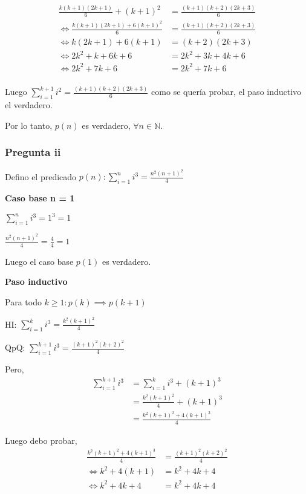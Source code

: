 \begin{align*}
    \frac{k(k+1)(2k+1)}{6} + (k+1)^2 &= \frac{(k+1)(k+2)(2k+3)}{6} \\
    \iff \frac{k(k+1)(2k+1) + 6(k+1)^2}{6} &= \frac{(k+1)(k+2)(2k+3)}{6} \\
    \iff k(2k+1) + 6(k+1) &= (k+2)(2k+3) \\
    \iff 2k^2+k + 6k+6 &= 2k^2+3k+4k+6 \\
    \iff 2k^2+7k+6 &= 2k^2+7k+6 \\
\end{align*}

Luego $\sum_{i=1}^{k+1}i^2 =  \frac{(k+1)(k+2)(2k+3)}{6}$ como se quería probar, el paso inductivo el verdadero.

Por lo tanto, $p(n)$ es verdadero, $\forall n \in \mathbb{N}$.

\subsubsection{Pregunta ii}

Defino el predicado $p(n) : \sum_{i=1}^{n}i^3 = \frac{n^2(n+1)^2}{4}$

\textbf{Caso base n = 1}

$\sum_{i=1}^{n}i^3 = 1^3 = 1$

$\frac{n^2(n+1)^2}{4} = \frac{4}{4} = 1$

Luego el caso base $p(1)$ es verdadero.

\textbf{Paso inductivo}

Para todo $k \geq 1: p(k) \implies p(k+1)$

HI: $\sum_{i=1}^{k}i^3 = \frac{k^2(k+1)^2}{4}$

QpQ: $\sum_{i=1}^{k+1}i^3 = \frac{(k+1)^2(k+2)^2}{4}$

Pero,
\begin{align*}
    \sum_{i=1}^{k+1}i^3 &= \sum_{i=1}^{k}i^3 + (k+1)^3 \\
    &= \frac{k^2(k+1)^2}{4} + (k+1)^3 \\
    &= \frac{k^2(k+1)^2 + 4(k+1)^3}{4}
\end{align*}

Luego debo probar, 
\begin{align*}
    \frac{k^2(k+1)^2 + 4(k+1)^3}{4} &= \frac{(k+1)^2(k+2)^2}{4} \\
    \iff k^2 + 4(k+1) &= k^2 + 4k + 4 \\
    \iff k^2 + 4k + 4 &= k^2 + 4k + 4 \\
\end{align*}

